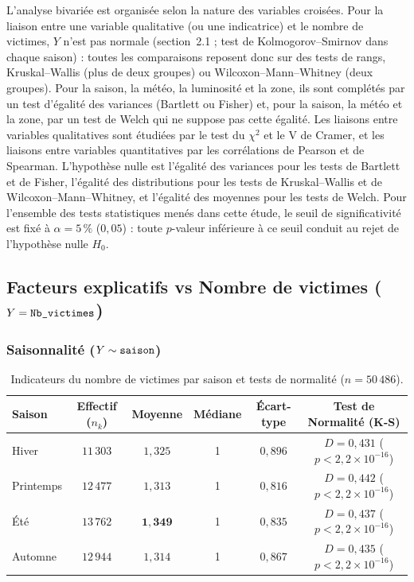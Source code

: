\documentclass[11pt,a4paper]{article}
\begin{document}
L'analyse bivariée est organisée selon la nature des variables croisées. Pour la liaison entre une variable qualitative (ou une indicatrice) et le nombre de victimes, $Y$ n'est pas normale (section~2.1 ; test de Kolmogorov--Smirnov dans chaque saison) : toutes les comparaisons reposent donc sur des tests de rangs, Kruskal--Wallis (plus de deux groupes) ou Wilcoxon--Mann--Whitney (deux groupes). Pour la saison, la météo, la luminosité et la zone, ils sont complétés par un test d'égalité des variances (Bartlett ou Fisher) et, pour la saison, la météo et la zone, par un test de Welch qui ne suppose pas cette égalité. Les liaisons entre variables qualitatives sont étudiées par le test du $\chi^2$ et le V de Cramer, et les liaisons entre variables quantitatives par les corrélations de Pearson et de Spearman. L'hypothèse nulle est l'égalité des variances pour les tests de Bartlett et de Fisher, l'égalité des distributions pour les tests de Kruskal--Wallis et de Wilcoxon--Mann--Whitney, et l'égalité des moyennes pour les tests de Welch. Pour l'ensemble des tests statistiques menés dans cette étude, le seuil de significativité est fixé à $\alpha = 5\,\%$ ($0{,}05$) : toute $p$-valeur inférieure à ce seuil conduit au rejet de l'hypothèse nulle $H_0$.

\subsection{Facteurs explicatifs vs Nombre de victimes ($Y = \text{\texttt{Nb\_victimes}}$)}

\subsubsection{Saisonnalité ($Y \sim \text{\texttt{saison}}$)}
\begin{table}[H]
\centering
\small
\begin{tabular}{lccccc}
\toprule
\textbf{Saison} & \textbf{Effectif ($n_k$)} & \textbf{Moyenne} & \textbf{Médiane} & \textbf{Écart-type} & \textbf{Test de Normalité (K-S)} \\
\midrule
Hiver      & $11\,303$ & $1{,}325$ & 1 & $0{,}896$ & $D = 0{,}431$ ($p < 2{,}2 \times 10^{-16}$) \\
Printemps  & $12\,477$ & $1{,}313$ & 1 & $0{,}816$ & $D = 0{,}442$ ($p < 2{,}2 \times 10^{-16}$) \\
Été        & $13\,762$ & $\mathbf{1{,}349}$ & 1 & $0{,}835$ & $D = 0{,}437$ ($p < 2{,}2 \times 10^{-16}$) \\
Automne    & $12\,944$ & $1{,}314$ & 1 & $0{,}867$ & $D = 0{,}435$ ($p < 2{,}2 \times 10^{-16}$) \\
\bottomrule
\end{tabular}
\caption{Indicateurs du nombre de victimes par saison et tests de normalité ($n = 50\,486$).}
\label{tab:biv_saison}
\end{table}
\end{document}
